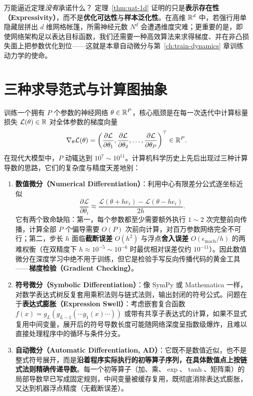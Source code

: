 \begin{insightBox}{万能逼近定理\emph{没有}承诺什么？}
定理~\ref{thm:uat-1d} 证明的只是\textbf{表示存在性（Expressivity）}，而不是\textbf{优化可达性}与\textbf{样本泛化性}。在高维 $\mathbb{R}^d$ 中，若强行用单隐藏层拼出 $d$ 维网格帐篷，所需神经元数 $N^d$ 会遭遇维度灾难；更重要的是，即使网络架构足以表达目标函数，我们还需要一种高效算法来求得梯度、并在非凸损失面上把参数优化到位——这就是本章自动微分与第~\ref{ch:train-dynamics} 章训练动力学的使命。
\end{insightBox}

\section{三种求导范式与计算图抽象}
\label{sec:three-diff}

训练一个拥有 $P$ 个参数的神经网络 $\theta \in \mathbb{R}^P$，核心瓶颈是在每一次迭代中计算标量损失 $\mathcal{L}(\theta) \in \mathbb{R}$ 对全体参数的梯度向量
\[
  \nabla_\theta \mathcal{L}(\theta) = \left(\frac{\partial \mathcal{L}}{\partial \theta_1}, \frac{\partial \mathcal{L}}{\partial \theta_2}, \dots, \frac{\partial \mathcal{L}}{\partial \theta_P}\right)^\top \in \mathbb{R}^P.
\]
在现代大模型中，$P$ 动辄达到 $10^7 \sim 10^{11}$。计算机科学历史上先后出现过三种计算导数的思路，它们的复杂度与精度天差地别：

\begin{enumerate}
  \item \textbf{数值微分（Numerical Differentiation）}：利用中心有限差分公式逐坐标近似
  \[
    \frac{\partial \mathcal{L}}{\partial \theta_i} \approx \frac{\mathcal{L}(\theta + h e_i) - \mathcal{L}(\theta - h e_i)}{2h}.
  \]
  它有两个致命缺陷：第一，每个参数都至少需要额外执行 $1\sim 2$ 次完整前向传播，计算全部 $P$ 个偏导需要 $O(P)$ 次前向计算，对百万参数网络完全不可行；第二，步长 $h$ 面临\textbf{截断误差} $O(h^2)$ 与浮点\textbf{舍入误差} $O(\epsilon_{\text{mach}}/h)$ 的两难权衡（在双精度下 $h \approx 10^{-5}\sim 10^{-6}$ 时最优相对误差仅约 $10^{-11}$）。因此数值微分在深度学习中绝不用于训练，但它是检验手写反向传播代码的黄金工具——\textbf{梯度检验（Gradient Checking）}。

  \item \textbf{符号微分（Symbolic Differentiation）}：像 SymPy 或 Mathematica 一样，对数学表达式树反复套用乘积法则与链式法则，输出封闭的符号公式。问题在于\textbf{表达式膨胀（Expression Swell）}：考虑嵌套复合函数 $f(x) = g_L(g_{L-1}(\cdots g_1(x)\cdots))$ 或带有共享子表达式的计算，如果不显式复用中间变量，展开后的符号导数长度可能随网络深度呈指数级爆炸，且难以直接处理程序中的循环与条件分支。

  \item \textbf{自动微分（Automatic Differentiation, AD）}：它既不是数值近似，也不是整式符号展开，而是\textbf{沿着程序实际执行的初等算子序列，在具体数值点上按链式法则精确传递导数}。每一个初等算子（加、乘、$\exp$、$\tanh$、矩阵乘）的局部导数早已写成固定规则，中间变量被缓存复用，既彻底消除表达式膨胀，又达到机器浮点精度（无截断误差）。
\end{enumerate}

